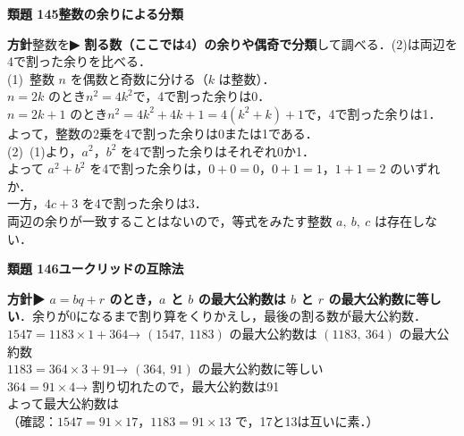\documentclass[a4paper,11pt]{ltjsarticle}
\newcommand{\ans}[2]{\Needspace{5\baselineskip}\vspace{6pt}%
  {\sffamily\bfseries 類題 #1\quad #2}\par}
\newcommand{\point}[1]{\textsf{\bfseries ▶ #1}}
\begin{document}
\ans{145}{整数の余りによる分類}
\begin{kai}
\textbf{方針}\quad 整数を\point{割る数（ここでは4）の余りや偶奇で分類}して調べる．(2)は両辺を4で割った余りを比べる．\\[2pt]
(1)\ 整数 $n$ を偶数と奇数に分ける（$k$ は整数）．\\
\hspace*{1.5em}$n=2k$ のとき\quad $n^2=4k^2$\quad で，4で割った余りは0．\\
\hspace*{1.5em}$n=2k+1$ のとき\quad $n^2=4k^2+4k+1=4(k^2+k)+1$\quad で，4で割った余りは1．\\
\hspace*{1.5em}よって，整数の2乗を4で割った余りは0または1である．\\[2pt]
(2)\ (1)より，$a^2$，$b^2$ を4で割った余りはそれぞれ0か1．\\
\hspace*{1.5em}よって $a^2+b^2$ を4で割った余りは，$0+0=0$，$0+1=1$，$1+1=2$ のいずれか．\\
\hspace*{1.5em}一方，$4c+3$ を4で割った余りは3．\\
\hspace*{1.5em}両辺の余りが一致することはないので，等式をみたす整数 $a,\ b,\ c$ は存在しない．
\end{kai}

\ans{146}{ユークリッドの互除法}
\begin{kai}
\textbf{方針}\quad \point{$a=bq+r$ のとき，$a$ と $b$ の最大公約数は $b$ と $r$ の最大公約数に等しい}．余りが0になるまで割り算をくりかえし，最後の割る数が最大公約数．\\[2pt]
$1547=1183\times1+364$\quad → $(1547,\ 1183)$ の最大公約数は $(1183,\ 364)$ の最大公約数\\
$1183=364\times3+91$\quad → $(364,\ 91)$ の最大公約数に等しい\\
$364=91\times4$\quad → 割り切れたので，最大公約数は91\\[2pt]
よって最大公約数は\\
（確認：$1547=91\times17$，$1183=91\times13$ で，17と13は互いに素．）
\end{kai}
\end{document}
